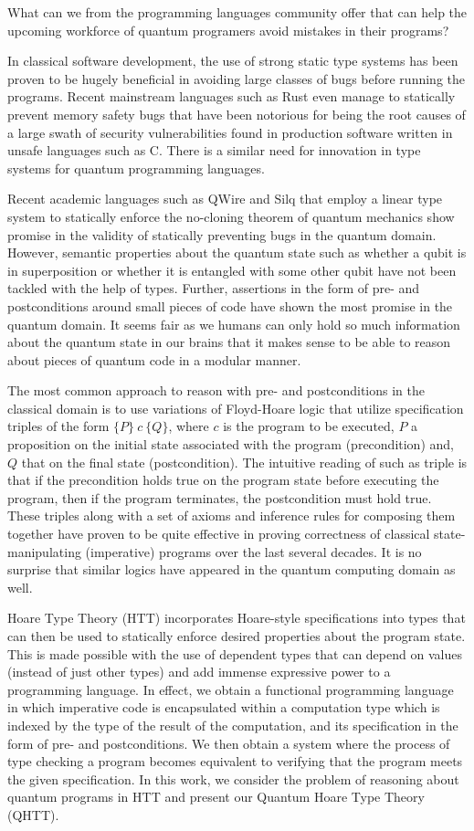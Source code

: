 \documentclass[adraft,creativecommons]{eptcs}
\newcommand{\HoareT}[3]{
    \{#1\} ~#2~ \{#3\}
}
\theoremstyle{definition}
\theoremstyle{remark}
\begin{document}
What can we from the programming languages community offer that can help the upcoming workforce of quantum programers avoid mistakes in their programs?

In classical software development, the use of strong static type systems has been proven to be hugely beneficial in avoiding large classes of bugs before running the programs. Recent mainstream languages such as Rust even manage to statically prevent memory safety bugs that have been notorious for being the root causes of a large swath of security vulnerabilities found in production software written in unsafe languages such as C. There is a similar need for innovation in type systems for quantum programming languages.

Recent academic languages such as QWire and Silq that employ a linear type system to statically enforce the no-cloning theorem of quantum mechanics show promise in the validity of statically preventing bugs in the quantum domain. However, semantic properties about the quantum state such as whether a qubit is in superposition or whether it is entangled with some other qubit have not been tackled with the help of types. Further, assertions in the form of pre- and postconditions around small pieces of code have shown the most promise in the quantum domain. It seems fair as we humans can only hold so much information about the quantum state in our brains that it makes sense to be able to reason about pieces of quantum code in a modular manner.

The most common approach to reason with pre- and postconditions in the classical domain is to use variations of Floyd-Hoare logic that utilize specification triples of the form $\HoareT{P}{c}{Q}$, where $c$ is the program to be executed, $P$ a proposition on the initial state associated with the program (precondition) and, $Q$ that on the final state (postcondition). The intuitive reading of such as triple is that if the precondition holds true on the program state before executing the program, then if the program terminates, the postcondition must hold true. These triples along with a set of axioms and inference rules for composing them together have proven to be quite effective in proving correctness of classical state-manipulating (imperative) programs over the last several decades. It is no surprise that similar logics have appeared in the quantum computing domain as well.

Hoare Type Theory (HTT) incorporates Hoare-style specifications into types that can then be used to statically enforce desired properties about the program state. This is made possible with the use of dependent types that can depend on values (instead of just other types) and add immense expressive power to a programming language. In effect, we obtain a functional programming language in which imperative code is encapsulated within a computation type which is indexed by the type of the result of the computation, and its specification in the form of pre- and postconditions. We then obtain a system where the process of type checking a program becomes equivalent to verifying that the program meets the given specification. In this work, we consider the problem of reasoning about quantum programs in HTT and present our Quantum Hoare Type Theory (QHTT).
\end{document}
